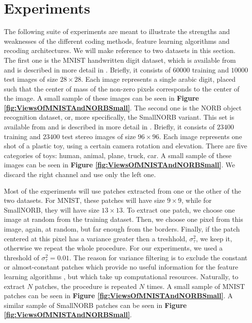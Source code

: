 \documentclass[12pt,a4paper,oneside,english]{UPBThesis}
\newcommand{\hctimes}[2]{{#1}\!\times\!{#2}}
\begin{document}
\clearpage
\newpage
\thispagestyle{empty}
\mbox{}

\chapter{Experiments}
\label{chap:Experiments}

The following suite of experiments are meant to illustrate the strengths and weaknesses of the different coding methods, feature learning algorithms and recoding architectures. We will make reference to two datasets in this section. The first one is the MNIST handwritten digit dataset, which is available from \cite{mnist-website} and is described in more detail in \cite{gradient-based-learning}. Briefly, it consists of $60000$ training and $10000$ test images of size $\hctimes{28}{28}$. Each image represents a single arabic digit, placed such that the center of mass of the non-zero pixels corresponds to the center of the image. A small sample of these images can be seen in \textbf{Figure \ref{fig:ViewsOfMNISTAndNORBSmall}}. The second one is the NORB object recognition dataset, or, more specifically, the SmallNORB variant. This set is available from \cite{norbsmall-website} and is described in more detail in \cite{learning-methods-invariance-pose-lighting}. Briefly, it consists of $23400$ training and $23400$ test stereo images of size $\hctimes{96}{96}$. Each image represents one shot of a plastic toy, using a certain camera rotation and elevation. There are five categories of toys: human, animal, plane, truck, car. A small sample of these images can be seen in \textbf{Figure \ref{fig:ViewsOfMNISTAndNORBSmall}}. We discard the right channel and use only the left one.

Most of the experiments will use patches extracted from one or the other of the two datasets. For MNIST, these patches will have size $\hctimes{9}{9}$, while for SmallNORB, they will have size $\hctimes{13}{13}$. To extract one patch, we choose one image at random from the training dataset. Then, we choose one pixel from this image, again, at random, but far enough from the borders. Finally, if the patch centered at this pixel has a variance greater then a treshhold, $\sigma^2_\tau$, we keep it, otherwise we repeat the whole procedure. For our experiments, we used a threshold of $\sigma^2_\tau = 0.01$. The reason for variance filtering is to exclude the constant or almost-constant patches which provide no useful information for the feature learning algorithms \cite{simple-method-sparse-coding,tiny-images}, but which take up computational resources. Naturally, to extract $N$ patches, the procedure is repeated $N$ times. A small sample of MNIST patches can be seen in \textbf{Figure \ref{fig:ViewsOfMNISTAndNORBSmall}}. A similar sample of SmallNORB patches can be seen in \textbf{Figure \ref{fig:ViewsOfMNISTAndNORBSmall}}.
\end{document}
